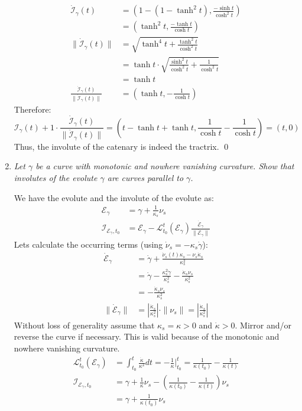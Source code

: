 \documentclass[a4paper,11pt,notitlepage,fullpage]{article}
\begin{document}
\begin{enumerate}
\begin{align*}
\dot{\mathcal I}_\gamma(t) &= \left(1 - (1 - \tanh^2 t), \frac{-\sinh t}{\cosh^2 t} \right) \\
&= \left( \tanh^2 t, \frac{-\tanh t}{\cosh t} \right) \\
\|\dot{\mathcal I}_\gamma(t)\| &= \sqrt{\tanh^4 t + \frac{\tanh^2 t}{\cosh^2 t}} \\
&= \tanh t \cdot \sqrt{\frac{\sinh^2 t}{\cosh^2 t} + \frac{1}{\cosh^2 t}} \\
&= \tanh t \\
\frac{\dot{\mathcal I}_\gamma(t)}{\|\dot{\mathcal I}_\gamma(t)\|} &= \left(\tanh t, -\frac{1}{\cosh t} \right)
\end{align*}
Therefore:
\begin{equation*}
\mathcal I_\gamma(t) + 1 \cdot \frac{\dot{\mathcal I}_\gamma(t)}{\|\dot{\mathcal I}_\gamma(t)\|} =
\left(t - \tanh t + \tanh t, \frac{1}{\cosh t}-\frac{1}{\cosh t} \right) = (t, 0)
\end{equation*}
Thus, the involute of the catenary is indeed the tractrix. \qed

\item \emph{Let $\gamma$ be a curve with monotonic and nowhere vanishing curvature. Show that involutes of the evolute $\gamma$ are curves parallel to $\gamma$.}

We have the evolute and the involute of the evolute as:
\begin{align*}
\mathcal E_\gamma &= \gamma + \frac{1}{\kappa_s}\nu_s \\
\mathcal I_{\mathcal E_\gamma, t_0} &= \mathcal E_\gamma - \mathcal L_{t_0}^t(\mathcal E_\gamma) \frac{\dot{\mathcal E}_\gamma}{\|\dot{\mathcal E}_\gamma \|}
\end{align*}
Lets calculate the occurring terms (using $\dot\nu_s = -\kappa_s\dot\gamma$):
\begin{align*}
\dot{\mathcal E}_\gamma &= \dot\gamma +\frac{\dot\nu_s(t)\kappa_s - \nu_s\dot\kappa_s}{\kappa_s^2} \\
&= \dot\gamma - \frac{\kappa_s^2 \dot\gamma}{\kappa_s^2} - \frac{\dot\kappa_s\nu_s}{\kappa_s^2} \\
&= - \frac{\dot\kappa_s\nu_s}{\kappa_s^2} \\
\|\dot{\mathcal E}_\gamma\| &=  \left|\frac{\dot\kappa_s}{\kappa_s^2}\right|\cdot\|\nu_s\| = \left|\frac{\dot\kappa_s}{\kappa_s^2}\right|
\end{align*}
Without loss of generality assume that $\kappa_s = \kappa > 0$ and $\dot\kappa > 0$. Mirror and/or reverse the curve if necessary. This is valid because of the monotonic and nowhere vanishing curvature.
\begin{align*}
\mathcal L_{t_0}^t(\mathcal E_\gamma) &= \int_{t_0}^t \frac{\dot\kappa}{\kappa^2} dt = -\frac{1}{\kappa}\Big|_{t_0}^t = \frac{1}{\kappa(t_0)} - \frac{1}{\kappa(t)} \\
\mathcal I_{\mathcal E_\gamma, t_0} &= \gamma + \frac{1}{\kappa}\nu_s - \left(\frac{1}{\kappa(t_0)} - \frac{1}{\kappa(t)}\right) \nu_s \\
&= \gamma + \frac{1}{\kappa(t_0)}\nu_s
\end{align*}


\end{enumerate}
\end{document}
